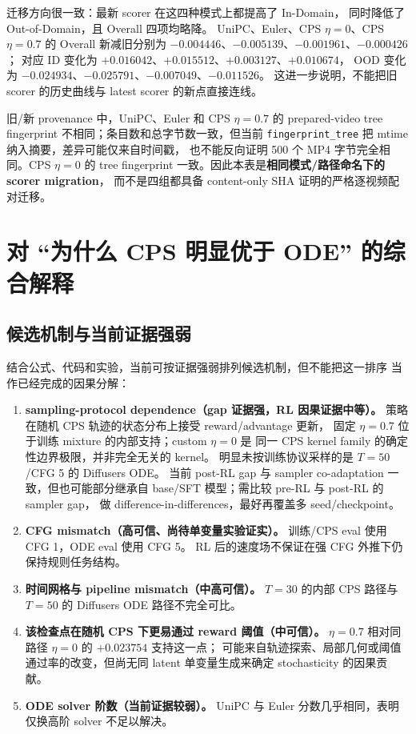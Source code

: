 \documentclass[11pt,a4paper]{article}
\newcommand{\code}[1]{\texttt{#1}}
\begin{document}
迁移方向很一致：最新 scorer 在这四种模式上都提高了 In-Domain，
同时降低了 Out-of-Domain，且 Overall 四项均略降。
UniPC、Euler、CPS $\eta=0$、CPS $\eta=0.7$ 的 Overall 新减旧分别为
$-0.004446$、$-0.005139$、$-0.001961$、$-0.000426$；
对应 ID 变化为 $+0.016042$、$+0.015512$、$+0.003127$、$+0.010674$，
OOD 变化为 $-0.024934$、$-0.025791$、$-0.007049$、$-0.011526$。
这进一步说明，不能把旧 scorer 的历史曲线与 latest scorer 的新点直接连线。

旧/新 provenance 中，UniPC、Euler 和 CPS $\eta=0.7$ 的
prepared-video tree fingerprint 不相同；条目数和总字节数一致，但当前
\code{fingerprint\_tree} 把 mtime 纳入摘要，差异可能仅来自时间戳，
也不能反向证明 500 个 MP4 字节完全相同。CPS $\eta=0$ 的 tree fingerprint
一致。因此本表是\textbf{相同模式/路径命名下的 scorer migration}，
而不是四组都具备 content-only SHA 证明的严格逐视频配对迁移。

\section{对 ``为什么 CPS 明显优于 ODE'' 的综合解释}

\subsection{候选机制与当前证据强弱}

结合公式、代码和实验，当前可按证据强弱排列候选机制，但不能把这一排序
当作已经完成的因果分解：

\begin{enumerate}
  \item \textbf{sampling-protocol dependence（gap 证据强，RL 因果证据中等）。}
  策略在随机 CPS 轨迹的状态分布上接受 reward/advantage 更新，
  固定 $\eta=0.7$ 位于训练 mixture 的内部支持；custom $\eta=0$ 是
  同一 CPS kernel family 的确定性边界极限，并非完全无关的 kernel。
  明显未按训练协议采样的是 $T=50$/CFG 5 的 Diffusers ODE。
  当前 post-RL gap 与 sampler co-adaptation 一致，但也可能部分继承自
  base/SFT 模型；需比较 pre-RL 与 post-RL 的 sampler gap，
  做 difference-in-differences，最好再覆盖多 seed/checkpoint。
  \item \textbf{CFG mismatch（高可信、尚待单变量实验证实）。}
  训练/CPS eval 使用 CFG 1，ODE eval 使用 CFG 5。
  RL 后的速度场不保证在强 CFG 外推下仍保持规则任务结构。
  \item \textbf{时间网格与 pipeline mismatch（中高可信）。}
  $T=30$ 的内部 CPS 路径与 $T=50$ 的 Diffusers ODE 路径不完全可比。
  \item \textbf{该检查点在随机 CPS 下更易通过 reward 阈值（中可信）。}
  $\eta=0.7$ 相对同路径 $\eta=0$ 的 $+0.023754$ 支持这一点；
  可能来自轨迹探索、局部几何或阈值通过率的改变，但尚无同 latent
  单变量生成来确定 stochasticity 的因果贡献。
  \item \textbf{ODE solver 阶数（当前证据较弱）。}
  UniPC 与 Euler 分数几乎相同，表明仅换高阶 solver 不足以解决。
\end{enumerate}
\end{document}
